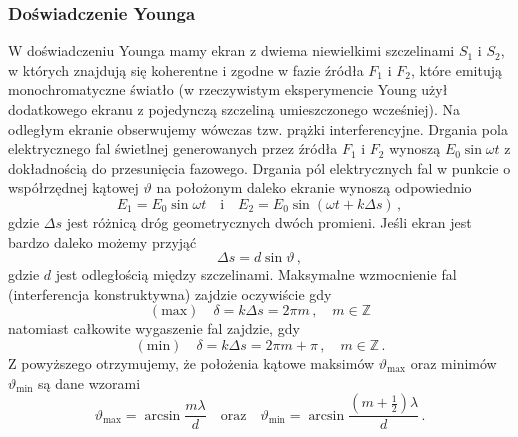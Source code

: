 \documentclass[../main.tex]{subfiles}
\begin{document}
\subsubsection{Doświadczenie Younga}
W doświadczeniu Younga mamy ekran z dwiema niewielkimi szczelinami \(S_1\) i \(S_2\), w których znajdują się koherentne i zgodne w fazie źródła \(F_1\) i \(F_2\), które emitują monochromatyczne światło (w rzeczywistym eksperymencie Young użył dodatkowego ekranu z pojedynczą szczeliną umieszczonego wcześniej). Na odległym ekranie obserwujemy wówczas tzw. prążki interferencyjne. Drgania pola elektrycznego fal świetlnej generowanych przez źródła \(F_1\) i \(F_2\) wynoszą \(E_0\sin\omega t\) z dokładnością do przesunięcia fazowego. Drgania pól elektrycznych fal w punkcie o współrzędnej kątowej \(\vartheta\) na położonym daleko ekranie wynoszą odpowiednio
\begin{equation*}
    E_1=E_0\sin\omega t\quad\text{i}\quad E_2=E_0\sin(\omega t+k\Delta s)\,,
\end{equation*}
gdzie \(\Delta s\) jest różnicą dróg geometrycznych dwóch promieni. Jeśli ekran jest bardzo daleko możemy przyjąć
\begin{equation*}
    \Delta s=d\sin\vartheta\,,
\end{equation*}
gdzie \(d\) jest odległością między szczelinami. Maksymalne wzmocnienie fal (interferencja konstruktywna) zajdzie oczywiście gdy
\begin{equation*}
    (\text{max})\quad \delta=k\Delta s=2\pi m\,,\quad m\in\mathbb{Z}
\end{equation*}
natomiast całkowite wygaszenie fal zajdzie, gdy
\begin{equation*}
    (\text{min})\quad \delta=k\Delta s=2\pi m +\pi\,,\quad m\in\mathbb{Z}\,.
\end{equation*}
Z powyższego otrzymujemy, że położenia kątowe maksimów \(\vartheta_\text{max}\) oraz minimów \(\vartheta_\text{min}\) są dane wzorami
\begin{equation*}
    \vartheta_\text{max}=\arcsin\frac{m\lambda}{d}\quad\text{oraz}\quad \vartheta_\text{min}=\arcsin\frac{(m+\frac{1}{2})\lambda}{d}\,.
\end{equation*}
\end{document}
